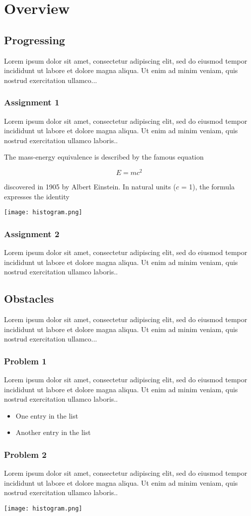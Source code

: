 
\chapter{Overview}
\section{Progressing}
Lorem ipsum dolor sit amet, consectetur adipiscing elit, sed do 
eiusmod tempor incididunt ut labore et dolore magna aliqua. Ut 
enim ad minim veniam, quis nostrud exercitation ullamco...

\subsection{Assignment 1}
Lorem ipsum dolor sit amet, consectetur adipiscing elit, sed do 
eiusmod tempor incididunt ut labore et dolore magna aliqua. Ut 
enim ad minim veniam, quis nostrud exercitation ullamco laboris..

The mass-energy equivalence is described by the famous equation
 
$$E=mc^2$$
 
discovered in 1905 by Albert Einstein. 
In natural units ($c$ = 1), the formula expresses the identity

\texttt{[image: histogram.png]}

\subsection{Assignment 2}
Lorem ipsum dolor sit amet, consectetur adipiscing elit, sed do 
eiusmod tempor incididunt ut labore et dolore magna aliqua. Ut 
enim ad minim veniam, quis nostrud exercitation ullamco laboris..

\section{Obstacles}
Lorem ipsum dolor sit amet, consectetur adipiscing elit, sed do 
eiusmod tempor incididunt ut labore et dolore magna aliqua. Ut 
enim ad minim veniam, quis nostrud exercitation ullamco...

\subsection{Problem 1}
Lorem ipsum dolor sit amet, consectetur adipiscing elit, sed do 
eiusmod tempor incididunt ut labore et dolore magna aliqua. Ut 
enim ad minim veniam, quis nostrud exercitation ullamco laboris..
\begin{itemize}
  \item One entry in the list
  \item Another entry in the list
\end{itemize}
\subsection{Problem 2}
Lorem ipsum dolor sit amet, consectetur adipiscing elit, sed do 
eiusmod tempor incididunt ut labore et dolore magna aliqua. Ut 
enim ad minim veniam, quis nostrud exercitation ullamco laboris..

\texttt{[image: histogram.png]}

